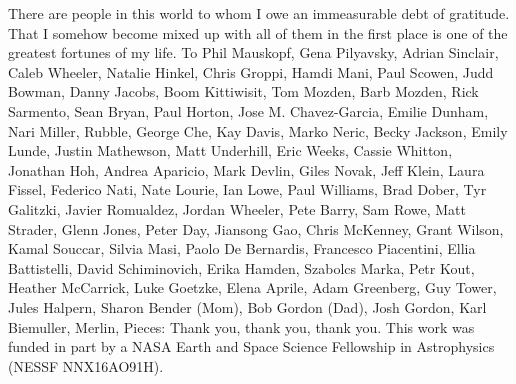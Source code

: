 There are people in this world to whom I owe an immeasurable debt of gratitude. That I somehow become mixed up with all of them in the first place is one of the greatest fortunes of my life.
\newline\newline
To Phil Mauskopf, Gena Pilyavsky, Adrian Sinclair, Caleb Wheeler, Natalie Hinkel, Chris Groppi, Hamdi Mani, Paul Scowen, Judd Bowman, Danny Jacobs, Boom Kittiwisit, Tom Mozden, Barb Mozden, Rick Sarmento, Sean Bryan, Paul Horton, Jose M. Chavez-Garcia, Emilie Dunham, Nari Miller, Rubble, George Che, Kay Davis, Marko Neric, Becky Jackson, Emily Lunde, Justin Mathewson, Matt Underhill, Eric Weeks, Cassie Whitton, Jonathan Hoh, Andrea Aparicio, Mark Devlin, Giles Novak, Jeff Klein, Laura Fissel, Federico Nati, Nate Lourie, Ian Lowe, Paul Williams, Brad Dober, Tyr Galitzki, Javier Romualdez, Jordan Wheeler, Pete Barry, Sam Rowe, Matt Strader, Glenn Jones, Peter Day, Jiansong Gao, Chris McKenney, Grant Wilson, Kamal Souccar, Silvia Masi, Paolo De Bernardis, Francesco Piacentini, Ellia Battistelli, David Schiminovich, Erika Hamden, Szabolcs Marka, Petr Kout, Heather McCarrick, Luke Goetzke, Elena Aprile, Adam Greenberg, Guy Tower, Jules Halpern, Sharon Bender (Mom), Bob Gordon (Dad), Josh Gordon, Karl Biemuller, Merlin, Pieces:
\newline\newline
Thank you, thank you, thank you.
\newline\newline
\noindent This work was funded in part by a NASA Earth and Space Science Fellowship in Astrophysics (NESSF NNX16AO91H).
